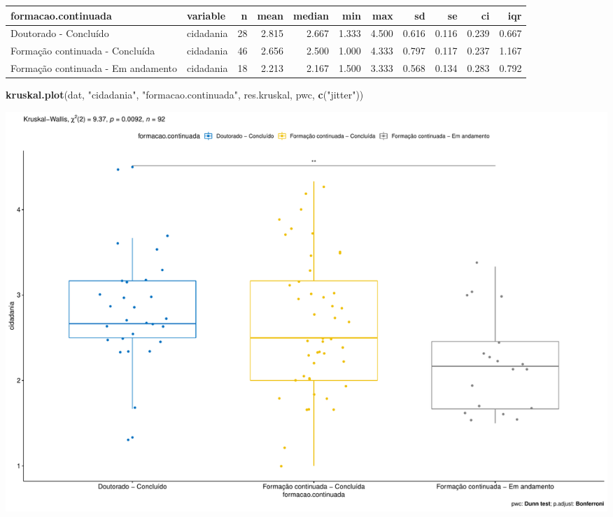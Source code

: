 \documentclass[]{article}
\newenvironment{Shaded}{\begin{snugshade}}{\end{snugshade}}
\newcommand{\KeywordTok}[1]{\textcolor[rgb]{0.13,0.29,0.53}{\textbf{#1}}}
\newcommand{\NormalTok}[1]{#1}
\newcommand{\StringTok}[1]{\textcolor[rgb]{0.31,0.60,0.02}{#1}}
\begin{document}
\begin{longtable}[]{@{}llrrrrrrrrr@{}}
\toprule
formacao.continuada & variable & n & mean & median & min & max & sd & se
& ci & iqr\tabularnewline
\midrule
\endhead
Doutorado - Concluído & cidadania & 28 & 2.815 & 2.667 & 1.333 & 4.500 &
0.616 & 0.116 & 0.239 & 0.667\tabularnewline
Formação continuada - Concluída & cidadania & 46 & 2.656 & 2.500 & 1.000
& 4.333 & 0.797 & 0.117 & 0.237 & 1.167\tabularnewline
Formação continuada - Em andamento & cidadania & 18 & 2.213 & 2.167 &
1.500 & 3.333 & 0.568 & 0.134 & 0.283 & 0.792\tabularnewline
\bottomrule
\end{longtable}

\begin{Shaded}
\begin{Highlighting}[]
\KeywordTok{kruskal.plot}\NormalTok{(dat, }\StringTok{"cidadania"}\NormalTok{, }\StringTok{"formacao.continuada"}\NormalTok{, res.kruskal, pwc, }\KeywordTok{c}\NormalTok{(}\StringTok{"jitter"}\NormalTok{))}
\end{Highlighting}
\end{Shaded}

\includegraphics{kruskal_files/figure-latex/unnamed-chunk-5-1.pdf}
\end{document}
